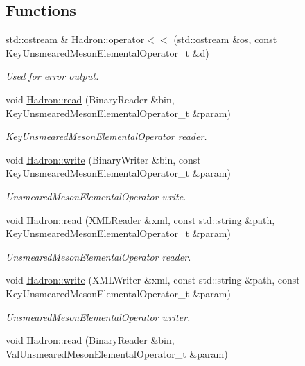 \subsection*{Functions}
\begin{DoxyCompactItemize}
\item 
std\+::ostream \& \mbox{\hyperlink{namespaceHadron_ae69192d40800d30f5ef75a6d3ce3ae6e}{Hadron\+::operator$<$$<$}} (std\+::ostream \&os, const Key\+Unsmeared\+Meson\+Elemental\+Operator\+\_\+t \&d)
\begin{DoxyCompactList}\small\item\em Used for error output. \end{DoxyCompactList}\item 
void \mbox{\hyperlink{namespaceHadron_a1a172c91f55bd8989d9751c7f8b5ac28}{Hadron\+::read}} (Binary\+Reader \&bin, Key\+Unsmeared\+Meson\+Elemental\+Operator\+\_\+t \&param)
\begin{DoxyCompactList}\small\item\em Key\+Unsmeared\+Meson\+Elemental\+Operator reader. \end{DoxyCompactList}\item 
void \mbox{\hyperlink{namespaceHadron_ac88cbe3678a2276ee3dd2d55fff0cabf}{Hadron\+::write}} (Binary\+Writer \&bin, const Key\+Unsmeared\+Meson\+Elemental\+Operator\+\_\+t \&param)
\begin{DoxyCompactList}\small\item\em Unsmeared\+Meson\+Elemental\+Operator write. \end{DoxyCompactList}\item 
void \mbox{\hyperlink{namespaceHadron_aa1de9a72a85fa51b9a685a0a2d674b7c}{Hadron\+::read}} (X\+M\+L\+Reader \&xml, const std\+::string \&path, Key\+Unsmeared\+Meson\+Elemental\+Operator\+\_\+t \&param)
\begin{DoxyCompactList}\small\item\em Unsmeared\+Meson\+Elemental\+Operator reader. \end{DoxyCompactList}\item 
void \mbox{\hyperlink{namespaceHadron_a12ff79f44bd22acfe6be486d4089262e}{Hadron\+::write}} (X\+M\+L\+Writer \&xml, const std\+::string \&path, const Key\+Unsmeared\+Meson\+Elemental\+Operator\+\_\+t \&param)
\begin{DoxyCompactList}\small\item\em Unsmeared\+Meson\+Elemental\+Operator writer. \end{DoxyCompactList}\item 
void \mbox{\hyperlink{namespaceHadron_a0dee7d09d7d8dd3947cd5a0c3c4c0447}{Hadron\+::read}} (Binary\+Reader \&bin, Val\+Unsmeared\+Meson\+Elemental\+Operator\+\_\+t \&param)

\end{DoxyCompactItemize}
